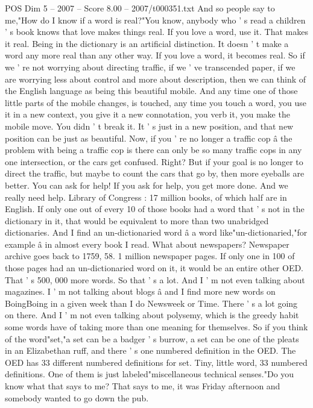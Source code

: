 \begin{textsample}{POS Dim 5 – 2007 – Score 8.00 – 2007/t000351.txt}
And so people say to me,"How do I know if a word is real?"You know, anybody who ' s read a children ' s book knows that love makes things real.
If you love a word, use it.
That makes it real.
Being in the dictionary is an artificial distinction.
It doesn ' t make a word any more real than any other way.
If you love a word, it becomes real.
So if we ' re not worrying about directing traffic, if we ' ve transcended paper, if we are worrying less about control and more about description, then we can think of the English language as being this beautiful mobile.
And any time one of those little parts of the mobile changes, is touched, any time you touch a word, you use it in a new context, you give it a new connotation, you verb it, you make the mobile move.
You didn ' t break it.
It ' s just in a new position, and that new position can be just as beautiful.
Now, if you ' re no longer a traffic cop â the problem with being a traffic cop is there can only be so many traffic cops in any one intersection, or the cars get confused.
Right?
But if your goal is no longer to direct the traffic, but maybe to count the cars that go by, then more eyeballs are better.
You can ask for help!
If you ask for help, you get more done.
And we really need help.
Library of Congress : 17 million books, of which half are in English.
If only one out of every 10 of those books had a word that ' s not in the dictionary in it, that would be equivalent to more than two unabridged dictionaries.
And I find an un-dictionaried word â a word like"un-dictionaried,"for example â in almost every book I read.
What about newspapers?
Newspaper archive goes back to 1759, 58. 1 million newspaper pages.
If only one in 100 of those pages had an un-dictionaried word on it, it would be an entire other OED.
That ' s 500, 000 more words.
So that ' s a lot.
And I ' m not even talking about magazines.
I ' m not talking about blogs â and I find more new words on BoingBoing in a given week than I do Newsweek or Time.
There ' s a lot going on there.
And I ' m not even talking about polysemy, which is the greedy habit some words have of taking more than one meaning for themselves.
So if you think of the word"set,"a set can be a badger ' s burrow, a set can be one of the pleats in an Elizabethan ruff, and there ' s one numbered definition in the OED.
The OED has 33 different numbered definitions for set.
Tiny, little word, 33 numbered definitions.
One of them is just labeled"miscellaneous technical senses."Do you know what that says to me?
That says to me, it was Friday afternoon and somebody wanted to go down the pub.

\end{textsample}
